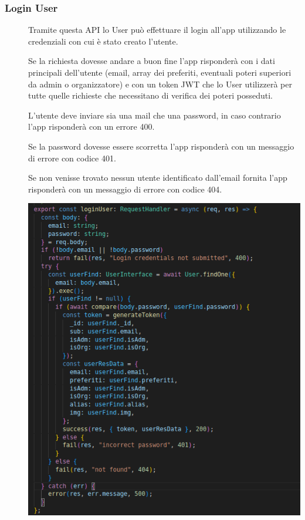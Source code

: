 \documentclass{article}
\begin{document}
\subsubsection{Login User}
\begin{description}
    \item[] Tramite questa API lo User può effettuare il login all'app utilizzando le credenziali con cui è stato creato l'utente.
    \item[] Se la richiesta dovesse andare a buon fine l'app risponderà con i dati principali dell'utente (email, array dei preferiti, eventuali poteri superiori da admin o organizzatore) e con un token JWT che lo User utilizzerà per tutte quelle richieste che necessitano di verifica dei poteri posseduti.
    \item[] L'utente deve inviare sia una mail che una password, in caso contrario l'app risponderà con un errore 400.
    \item[] Se la password dovesse essere scorretta l'app risponderà con un messaggio di errore con codice 401.
    \item[] Se non venisse trovato nessun utente identificato dall'email fornita l'app risponderà con un messaggio di errore con codice 404.
    \item[] \begin{center}
            \includegraphics[scale=0.5]{loginUser.png}
        \end{center}
\end{description}
\clearpage
\end{document}
